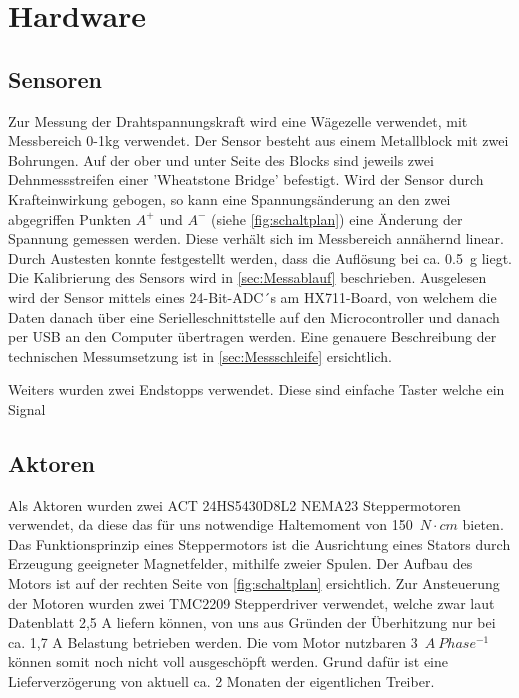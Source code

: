 \section{Hardware}
\label{sec:Hardware}





\subsection{Sensoren}

Zur Messung der Drahtspannungskraft wird eine Wägezelle verwendet, mit Messbereich 0-1kg verwendet. Der Sensor besteht aus einem Metallblock mit zwei Bohrungen. Auf der ober und unter Seite des Blocks sind jeweils zwei Dehnmessstreifen einer 'Wheatstone Bridge' befestigt. Wird der Sensor durch Krafteinwirkung gebogen, so kann eine Spannungsänderung an den zwei abgegriffen Punkten $A^+$ und $A^-$ (siehe \autoref{fig:schaltplan}) eine Änderung der Spannung gemessen werden. Diese verhält sich im Messbereich annähernd linear. Durch Austesten konnte festgestellt werden, dass die Auflösung bei ca. 0.5~g liegt. Die Kalibrierung des Sensors wird in \autoref{sec:Messablauf} beschrieben.\newline
Ausgelesen wird der Sensor mittels eines 24-Bit-ADC´s am HX711-Board, von welchem die Daten danach über eine Serielleschnittstelle auf den Microcontroller und danach per USB an den Computer übertragen werden. Eine genauere Beschreibung der technischen Messumsetzung ist in \autoref{sec:Messschleife} ersichtlich. 


Weiters wurden zwei Endstopps verwendet. Diese sind einfache Taster welche ein Signal

\subsection{Aktoren}

Als Aktoren wurden zwei ACT 24HS5430D8L2 NEMA23 Steppermotoren verwendet, da diese das für uns notwendige Haltemoment von 150~$N \cdot cm$ bieten. Das Funktionsprinzip eines Steppermotors ist die Ausrichtung eines Stators durch Erzeugung geeigneter Magnetfelder, mithilfe zweier Spulen. Der Aufbau des Motors ist auf der rechten Seite von \autoref{fig:schaltplan} ersichtlich. \newline
Zur Ansteuerung der Motoren wurden zwei TMC2209 Stepperdriver verwendet, welche zwar laut Datenblatt 2,5 A liefern können, von uns aus Gründen der Überhitzung nur bei ca. 1,7 A Belastung betrieben werden. Die vom Motor nutzbaren 3~$A~Phase^{-1}$ können somit noch nicht voll ausgeschöpft werden. Grund dafür ist eine Lieferverzögerung von aktuell ca. 2 Monaten der eigentlichen Treiber.


